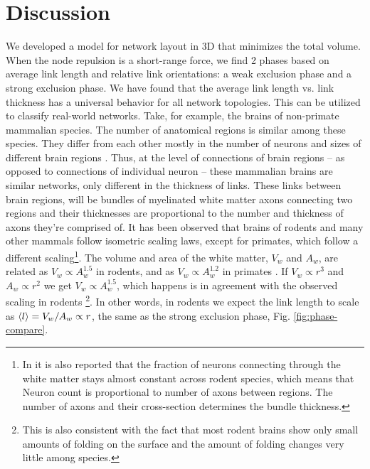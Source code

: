 \documentclass[nofootinbib,preprint,floatfix,endfloats]{revtex4} %
\begin{document}
\section{Discussion}
We developed a model for network layout in 3D that minimizes the total volume. 
When the node repulsion is a short-range force, we find 2 phases based on average link length and relative link orientations: a weak exclusion phase and a strong exclusion phase. 
We have found that the average link length vs. link thickness has a universal behavior for all network topologies. 
This can be utilized to classify real-world networks. 
Take, for example, the brains of non-primate mammalian species. 
The number of anatomical regions is similar among these species. 
They differ from each other mostly in the number of neurons and sizes of different brain regions \cite{azevedo2009equal, herculano2012remarkable, herculano2014brain}. 
Thus, at the level of connections of brain regions -- as opposed to connections of individual neuron -- these mammalian brains are similar networks, only different in the thickness of links. 
These links 
between brain regions, will be bundles of myelinated white matter axons connecting two regions and their thicknesses are proportional to the number and thickness of axons they're comprised of. 
It has been observed that brains of rodents \cite{herculano2012remarkable} and many other mammals \cite{herculano2014brain} follow isometric scaling laws, except for primates, which follow a different scaling\footnote{In \cite{herculano2012remarkable} it is also reported that the fraction of neurons connecting through the white matter stays almost constant across rodent species, which means that Neuron count is proportional to number of axons between regions. The number of axons and their cross-section determines the bundle thickness.}. 
The volume and area of the white matter, $V_w$ and $A_w$, are related as $V_w\propto A_w^{1.5}$ in rodents, and as $V_w \propto A_w^{1.2}$ in primates  \cite{herculano2012remarkable}. 
If $V_w \propto r^3$ and $A_w \propto r^2$ we get $V_w \propto A_w^{1.5}$, which happens is in agreement with the observed scaling in rodents
\footnote{This is also consistent with the fact that most rodent brains show only small amounts of folding on the surface and the amount of folding changes very little among species.}. In other words, in rodents we expect the link length to scale as $ \left<l\right> = V_w/A_w \propto r $, the same as the strong exclusion phase, Fig. \ref{fig:phase-compare}. 
\end{document}
